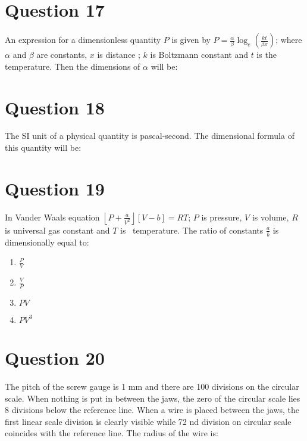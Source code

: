 \documentclass{article}
\begin{document}
\section*{Question 17}
An expression for a dimensionless quantity \(P\) is given by \(P =\frac{\alpha}{\beta} \log _{ e }\left(\frac{ kt }{\beta x }\right)\); where \(\alpha\) and \(\beta\) are constants, \(x\) is distance ; \(k\) is Boltzmann constant and \(t\) is the temperature. Then the dimensions of \(\alpha\) will be:
\begin{enumerate}[label=(\alph*)]
\end{enumerate}
\newpage
\section*{Question 18}
The SI unit of a physical quantity is pascal-second. The dimensional formula of this quantity will be: 
\begin{enumerate}[label=(\alph*)]
\end{enumerate}
\newpage
\section*{Question 19}
In Vander Waals equation \(\left\lfloor P +\frac{ a }{ V ^2}\right\rfloor[ V - b ]= RT\); \(P\) is pressure, \(V\) is volume, \(R\) is universal gas constant and \(T\) is  temperature. The ratio of constants \(\frac{ a }{ b }\) is dimensionally equal to:
\begin{enumerate}[label=(\alph*)]
\item \(\frac{P}{V}\)
\item \(\frac{ V }{ P }\)
\item \(PV\)
\item \(PV ^3\)
\end{enumerate}
\newpage
\section*{Question 20}
The pitch of the screw gauge is 1 mm and there are 100 divisions on the circular scale. When nothing is put in between the jaws, the zero of the circular scale lies 8 divisions below the reference line. When a wire is placed between the jaws, the first linear scale division is clearly visible while 72 nd division on circular scale coincides with the reference line. The radius of the wire is: 
\begin{enumerate}[label=(\alph*)]
\end{enumerate}
\newpage
\end{document}

